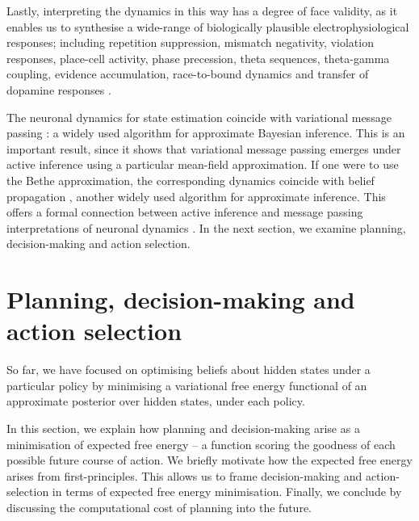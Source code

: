\documentclass{article}
\begin{document}
Lastly, interpreting the dynamics in this way has a degree of face validity, as it enables us to synthesise a wide-range of biologically plausible electrophysiological responses; including repetition suppression, mismatch negativity, violation responses, place-cell activity, phase precession, theta sequences, theta-gamma coupling, evidence accumulation, race-to-bound dynamics and transfer of dopamine responses \cite{schwartenbeckDopaminergicMidbrainEncodes2015,fristonActiveInferenceProcess2017}.

The neuronal dynamics for state estimation coincide with variational message passing \cite{winnVariationalMessagePassing2005,dauwelsVariationalMessagePassing2007}: a widely used algorithm for approximate Bayesian inference. This is an important result, since it shows that variational message passing emerges under active inference using a particular mean-field approximation. If one were to use the Bethe approximation, the corresponding dynamics coincide with belief propagation \cite{bishopPatternRecognitionMachine2006,loeligerIntroductionFactorGraphs2004,parrNeuronalMessagePassing2019,schwobelActiveInferenceBelief2018,yedidiaConstructingFreeEnergyApproximations2005}, another widely used algorithm for approximate inference. This offers a formal connection between active inference and message passing interpretations of neuronal dynamics \cite{fristonGraphicalBrainBelief2017,dauwelsMeasuringNeuralSynchrony2007,georgeBeliefPropagationWiring2005}. In the next section, we examine planning, decision-making and action selection.


\section{Planning, decision-making and action selection}

So far, we have focused on optimising beliefs about hidden states under a particular policy by minimising a variational free energy functional of an approximate posterior over hidden states, under each policy.

In this section, we explain how planning and decision-making arise as a minimisation of expected free energy -- a function scoring the goodness of each possible future course of action. We briefly motivate how the expected free energy arises from first-principles. This allows us to frame decision-making and action-selection in terms of expected free energy minimisation. Finally, we conclude by discussing the computational cost of planning into the future.
\end{document}
